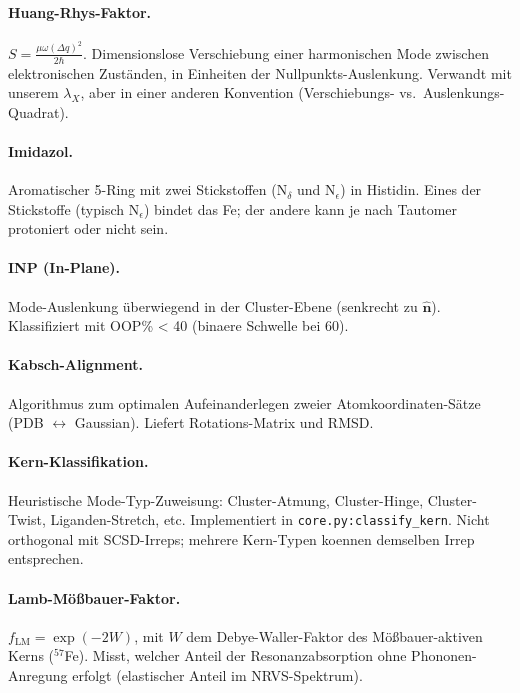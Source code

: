 \documentclass[11pt,a4paper,twoside]{article}
\theoremstyle{remark}
\begin{document}
\paragraph{Huang-Rhys-Faktor.}
$S = \frac{\mu\omega(\Delta q)^2}{2\hbar}$. Dimensionslose
Verschiebung einer harmonischen Mode zwischen elektronischen
Zust\"anden, in Einheiten der Nullpunkts-Auslenkung. Verwandt mit
unserem $\lambda_X$, aber in einer anderen Konvention
(Verschiebungs- vs.\ Auslenkungs-Quadrat).

\paragraph{Imidazol.}
Aromatischer 5-Ring mit zwei Stickstoffen (N$_\delta$ und N$_\epsilon$)
in Histidin. Eines der Stickstoffe (typisch N$_\epsilon$) bindet
das Fe; der andere kann je nach Tautomer protoniert oder nicht
sein.

\paragraph{INP (In-Plane).}
Mode-Auslenkung \"uberwiegend in der Cluster-Ebene (senkrecht zu
$\hat{\mathbf{n}}$). Klassifiziert mit OOP\% < 40 (binaere
Schwelle bei 60).

\paragraph{Kabsch-Alignment.}
Algorithmus zum optimalen Aufeinanderlegen zweier
Atomkoordinaten-S\"atze (PDB $\leftrightarrow$ Gaussian).
Liefert Rotations-Matrix und RMSD.

\paragraph{Kern-Klassifikation.}
Heuristische Mode-Typ-Zuweisung: Cluster-Atmung,
Cluster-Hinge, Cluster-Twist, Liganden-Stretch, etc.
Implementiert in \texttt{core.py:classify\_kern}. Nicht orthogonal
mit SCSD-Irreps; mehrere Kern-Typen koennen demselben Irrep
entsprechen.

\paragraph{Lamb-M\"o{\ss}bauer-Faktor.}
$f_\text{LM} = \exp(-2W)$, mit $W$ dem Debye-Waller-Faktor des
M\"o{\ss}bauer-aktiven Kerns ($^{57}$Fe). Misst, welcher Anteil
der Resonanzabsorption ohne Phononen-Anregung erfolgt
(elastischer Anteil im NRVS-Spektrum).
\end{document}
